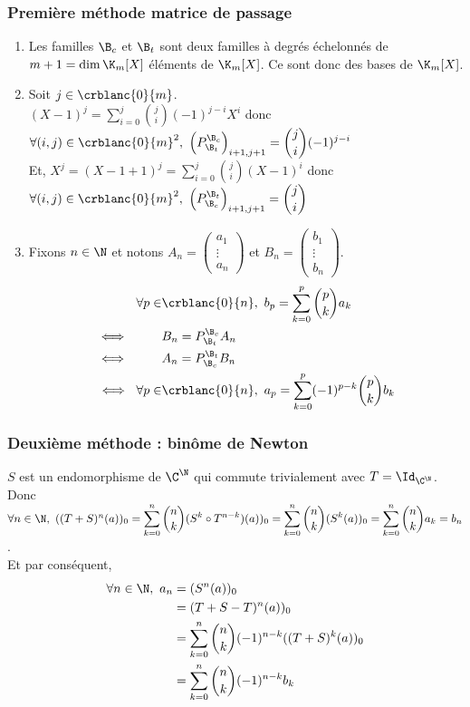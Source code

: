 \documentclass{book}
\begin{document}
	\subsubsection{Première méthode matrice de passage }
	\begin{enumerate}
		\item Les familles $\B_c$ et $\B_t$ sont deux familles à degrés échelonnés de $m+1=\dim \K_m[X]$ éléments de $\K_m[X]$. Ce sont donc des bases de $\K_m[X]$.
		\item Soit $j\in \crblanc{0}{m}$.\\
		$(X-1)^j=\displaystyle\sum\limits_{i=0}^{j} \binom{j}{i}(-1)^{j-i}X^i$ donc $\forall (i,j)\in \crblanc{0}{m}^2,\ \displaystyle\left(P_{\B_t}^{\B_c}\right)_{i+1,j+1}=\binom{j}{i}(-1)^{j-i}$\\
		Et, $X^j=(X-1+1)^j=\displaystyle\sum\limits_{i=0}^j \binom{j}{i}(X-1)^i$ donc $\forall (i,j)\in \crblanc{0}{m}^2,\ \displaystyle\left(P_{\B_c}^{\B_t}\right)_{i+1,j+1}=\binom{j}{i}$
		\item Fixons $n\in \N$ et notons $A_n=\begin{pmatrix} a_1\\\vdots\\a_n\end{pmatrix}$ et $B_n=\begin{pmatrix} b_1\\\vdots\\b_n\end{pmatrix}$.
		\begin{align*}
			\forall p\in&\crblanc{0}{n},\ b_p=\displaystyle\sum\limits_{k=0}^p\binom{p}{k}a_k\\
			\iff\ \ \ \ \ \ \ \ &B_n=P_{\B_t}^{\B_c}A_n\\
			\iff\ \ \ \ \ \ \ \ &A_n=P_{\B_c}^{\B_t}B_n\\
			\iff\  \forall p\in&\crblanc{0}{n},\ a_p=\displaystyle\sum\limits_{k=0}^p(-1)^{p-k}\binom{p}{k}b_k
		\end{align*}
	\end{enumerate}
	
	\subsubsection{Deuxième méthode : binôme de Newton }
	$S$ est un endomorphisme de $\C^\N$ qui commute trivialement avec $T=\Id_{\C^\N}$.\\
	Donc $\forall n\in \N,\ ((T+S)^n(a))_0=\displaystyle\sum_{k=0}^n\binom{n}{k}(S^k\circ T^{n-k})(a))_0=\sum_{k=0}^n\binom{n}{k}(S^k(a))_0=\sum_{k=0}^n\binom{n}{k}a_k=b_n$.\\
	Et par conséquent,
	\begin{align*}
		\forall n\in \N,\ a_n&=(S^n(a))_0\\
		&=(T+S-T)^n(a))_0\\
		&=\sum_{k=0}^n\binom{n}{k}(-1)^{n-k}((T+S)^k(a))_0\\
		&=\sum_{k=0}^n\binom{n}{k}(-1)^{n-k}b_k
	\end{align*}
	
\end{document}

